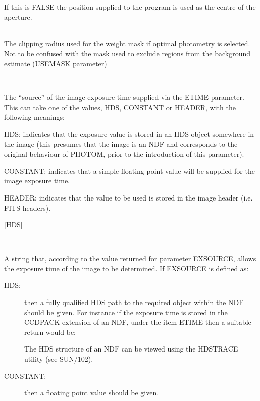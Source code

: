 \documentclass[twoside,11pt]{article}
\newcommand{\xref}[3]{#1}
\renewcommand{\_}{\texttt{\symbol{95}}}
\newcommand{\sstsubsection}[1]{ \item[{#1}] \mbox{} \\}
\newcommand{\sstsubsection}[1]{\item[{#1}]}
\begin{document}
{{{         If this is FALSE the position supplied to the program is used
         as the centre of the aperture.
      }
      \sstsubsection{
         CLIP = \_REAL (Read)
      }{
         The clipping radius used for the weight mask if optimal photometry
         is selected. Not to be confused with the mask used to exclude
         regions from the background estimate (USEMASK parameter)
      }
      \sstsubsection{
         EXSOURCE = LITERAL (Read)
      }{
        The ``source'' of the image exposure time supplied via the ETIME
        parameter. This can take one of the values, HDS, CONSTANT or
        HEADER, with the following meanings:
        \begin{description}
        \item{HDS:} indicates that the exposure value is stored in an HDS
          object somewhere in the image (this presumes that the image is
          an NDF and corresponds to the original behaviour of PHOTOM,
          prior to the introduction of this parameter).
        \item{CONSTANT:} indicates that a simple floating point value will be
          supplied for the image exposure time.
        \item{HEADER:} indicates that the value to be used is stored in the
          image header (i.e. FITS headers).
        \end{description}
        [HDS]
      }
      \sstsubsection{
         ETIME = LITERAL (Read)
      }{
        A string that, according to the value returned for parameter
        EXSOURCE, allows the exposure time of the image to be
        determined. If EXSOURCE is defined as:
        \begin{description}
          \item[HDS:] then a fully qualified HDS path to the required object
            within the NDF should be given. For instance if the exposure
            time is stored in the CCDPACK extension of an NDF, under the
            item ETIME then a suitable return would be:
            The HDS structure of an NDF can be viewed using the HDSTRACE
            utility (see \xref{SUN/102}{sun102}{}).

          \item[CONSTANT:] then a floating point value should be given.


\end{description}}}}
\end{document}
